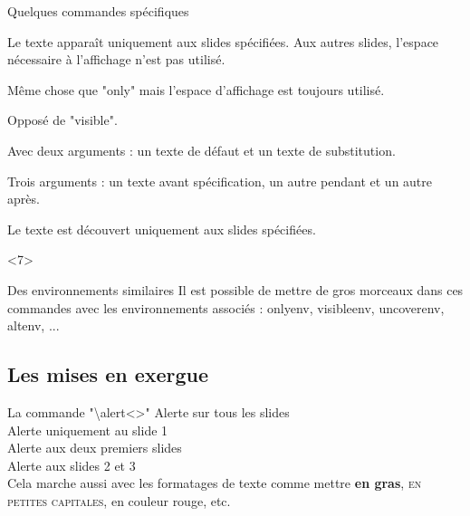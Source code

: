 \documentclass[8pt]{beamer}
\begin{document}
	\begin{frame}{Quelques commandes spécifiques}
		\begin{description}[<+->]
			\item[\textbackslash only<>] Le texte apparaît uniquement aux slides spécifiées. Aux autres slides, l'espace nécessaire à l'affichage n'est pas utilisé.
			\item[\textbackslash visible<>] Même chose que "only" mais l'espace d'affichage est toujours utilisé.
			\item[\textbackslash invisible<>] Opposé de "visible".
			\item[\textbackslash alt<>] Avec deux arguments : un texte de défaut et un texte de substitution.
			\item[\textbackslash temporal<>] Trois arguments : un texte avant spécification, un autre pendant et un autre après.
			\item[\textbackslash uncover<>] Le texte est découvert uniquement aux slides spécifiées.
		\end{description}
		\begin{uncoverenv}<7>
		\begin{block}{Des environnements similaires}
			Il est possible de mettre de gros morceaux dans ces commandes avec les environnements associés : onlyenv, visibleenv, uncoverenv, altenv, ...
		\end{block}
		\end{uncoverenv}
	\end{frame}
\subsection{Les mises en exergue}
	\begin{frame}{La commande "\textbackslash alert<>"}
		\alert{Alerte sur tous les slides}\\\vfill
		\alert<1>{Alerte uniquement au slide 1}\\\vfill
		\alert<1-2>{Alerte aux deux premiers slides}\\\vfill
		\alert<2-3>{Alerte aux slides 2 et 3}\\\vfill
		Cela marche aussi avec les formatages de texte comme mettre \textbf<4>{en gras}, \textsc<4>{en petites capitales}, {en couleur rouge}, etc.
	\end{frame}
\end{document}
